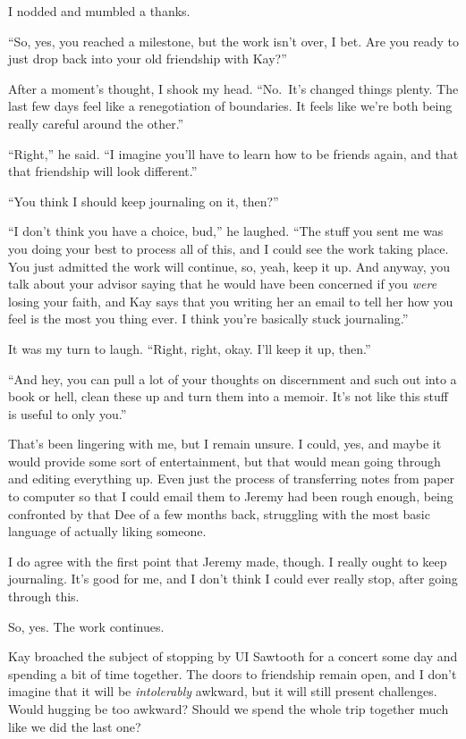 I nodded and mumbled a thanks.

``So, yes, you reached a milestone, but the work isn't over, I bet. Are you ready to just drop back into your old friendship with Kay?''

After a moment's thought, I shook my head. ``No.~It's changed things plenty. The last few days feel like a renegotiation of boundaries. It feels like we're both being really careful around the other.''

``Right,'' he said. ``I imagine you'll have to learn how to be friends again, and that that friendship will look different.''

``You think I should keep journaling on it, then?''

``I don't think you have a choice, bud,'' he laughed. ``The stuff you sent me was you doing your best to process all of this, and I could see the work taking place. You just admitted the work will continue, so, yeah, keep it up. And anyway, you talk about your advisor saying that he would have been concerned if you \emph{were} losing your faith, and Kay says that you writing her an email to tell her how you feel is the most you thing ever. I think you're basically stuck journaling.''

It was my turn to laugh. ``Right, right, okay. I'll keep it up, then.''

``And hey, you can pull a lot of your thoughts on discernment and such out into a book or hell, clean these up and turn them into a memoir. It's not like this stuff is useful to only you.''

That's been lingering with me, but I remain unsure. I could, yes, and maybe it would provide some sort of entertainment, but that would mean going through and editing everything up. Even just the process of transferring notes from paper to computer so that I could email them to Jeremy had been rough enough, being confronted by that Dee of a few months back, struggling with the most basic language of actually liking someone.

I do agree with the first point that Jeremy made, though. I really ought to keep journaling. It's good for me, and I don't think I could ever really stop, after going through this.

So, yes. The work continues.

Kay broached the subject of stopping by UI Sawtooth for a concert some day and spending a bit of time together. The doors to friendship remain open, and I don't imagine that it will be \emph{intolerably} awkward, but it will still present challenges. Would hugging be too awkward? Should we spend the whole trip together much like we did the last one?

